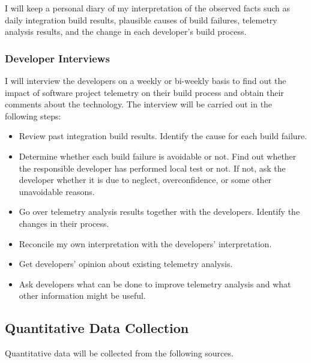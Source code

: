 I will keep a personal diary of my interpretation of the observed facts such as daily integration build results, plausible causes of build failures, telemetry analysis results, and the change in each developer's build process. 

      
\subsubsection{Developer Interviews}
	
I will interview the developers on a weekly or bi-weekly basis to find out the impact of software project telemetry on their build process and obtain their comments about the technology. The interview will be carried out in the following steps:
\begin{itemize}
	\item Review past integration build results. Identify the cause for each build failure.
	\item Determine whether each build failure is avoidable or not. Find out whether the responsible developer has performed local test or not. If not, ask the developer whether it is due to neglect, overconfidence, or some other unavoidable reasons.
	\item Go over telemetry analysis results together with the developers. Identify the changes in their process.
	\item Reconcile my own interpretation with the developers' interpretation.
	\item Get developers' opinion about existing telemetry analysis.
	\item Ask developers what can be done to improve telemetry analysis and what other information might be useful. 
\end{itemize}
	
		

\subsection{Quantitative Data Collection}

Quantitative data will be collected from the following sources.

